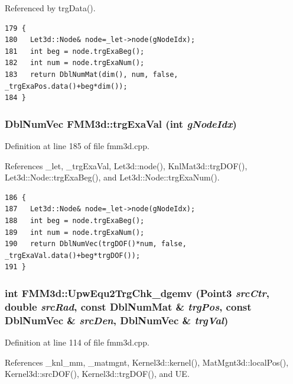 Referenced by trg\-Data().

\footnotesize\begin{verbatim}179 {
180   Let3d::Node& node=_let->node(gNodeIdx);
181   int beg = node.trgExaBeg();
182   int num = node.trgExaNum();
183   return DblNumMat(dim(), num, false, _trgExaPos.data()+beg*dim());
184 }
\end{verbatim}\normalsize 


\subsubsection{\setlength{\rightskip}{0pt plus 5cm}Dbl\-Num\-Vec FMM3d::trg\-Exa\-Val (int {\em g\-Node\-Idx})\hspace{0.3cm}{\tt  [protected]}}\label{classFMM3d_17d0a56b64656019c397c42a7957f986_17d0a56b64656019c397c42a7957f986}




Definition at line 185 of file fmm3d.cpp.

References \_\-let, \_\-trg\-Exa\-Val, Let3d::node(), Knl\-Mat3d::trg\-DOF(), Let3d::Node::trg\-Exa\-Beg(), and Let3d::Node::trg\-Exa\-Num().

\footnotesize\begin{verbatim}186 {
187   Let3d::Node& node=_let->node(gNodeIdx);
188   int beg = node.trgExaBeg();
189   int num = node.trgExaNum();
190   return DblNumVec(trgDOF()*num, false, _trgExaVal.data()+beg*trgDOF());
191 }
\end{verbatim}\normalsize 


\subsubsection{\setlength{\rightskip}{0pt plus 5cm}int FMM3d::Upw\-Equ2Trg\-Chk\_\-dgemv (Point3 {\em src\-Ctr}, double {\em src\-Rad}, const Dbl\-Num\-Mat \& {\em trg\-Pos}, const Dbl\-Num\-Vec \& {\em src\-Den}, Dbl\-Num\-Vec \& {\em trg\-Val})\hspace{0.3cm}{\tt  [protected]}}\label{classFMM3d_e30c5ae2e265387cebaa158417b967e7_e30c5ae2e265387cebaa158417b967e7}




Definition at line 114 of file fmm3d.cpp.

References \_\-knl\_\-mm, \_\-matmgnt, Kernel3d::kernel(), Mat\-Mgnt3d::local\-Pos(), Kernel3d::src\-DOF(), Kernel3d::trg\-DOF(), and UE.

